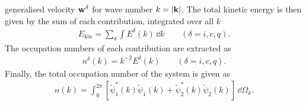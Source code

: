 generalised velocity \(\vb{w}^\delta \) for wave number \(k=|\vb{k}|\).
The total kinetic energy is then given by the sum of each contribution,
integrated over all \(k\)
\begin{align}
    E_\mathrm{kin} = \sum_\delta \int E^\delta (k) \, \dd k
    \qquad (\delta = i, c, q).
\end{align}
The occupation numbers of each contribution are extracted as
\begin{align}
    n^\delta(k) = k^{-2}E^\delta(k) \qquad (\delta = i, c, q).
\end{align}
Finally, the total occupation number of the system is given as
\begin{align}
    n(k) = \int_{0}^{2\pi} \left[\tilde{\psi}_1^*(k)\tilde{\psi}_1(k)
    + \tilde{\psi}_2^*(k)\tilde{\psi}_2(k)\right] \, \dd \Omega_k.
\end{align}


